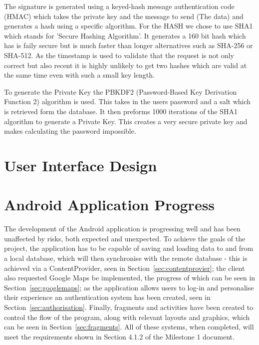 \documentclass[11pt,a4paper]{article}
\begin{document}
The signature is generated using a keyed-hash message authentication code (HMAC) which takes the private key and the message to send (The data) and generates a hash using a specific algorithm. For the HASH we chose to use SHA1 which stands for 'Secure Hashing Algorithm'. It generates a 160 bit hash which has is faily secure but is much faster than longer alternatives such as SHA-256 or SHA-512. As the timestamp is used to validate that the request is not only correct but also recent it is highly unlikely to get two hashes which are valid at the same time even with such a small key length. 

To generate the Private Key the PBKDF2 (Password-Based Key Derivation Function 2) algorithm is used. This takes in the users password and a salt which is retrieved form the database. It then preforms 1000 iterations of the SHA1 algorithm to generate a Private Key. This creates a very secure private key and makes calculating the password impossible. 




\section{User Interface Design}

\section{Android Application Progress}
The development of the Android application is progressing well and has been unaffected by risks, both expected and unexpected. To achieve the goals of the project, the application has to be capable of saving and loading data to and from a local database, which will then synchronise with the remote database - this is achieved via a ContentProvider, seen in Section~\ref{sec:contentprovier}; the client also requested Google Maps be implemented, the progress of which can be seen in Section~\ref{sec:googlemaps}; as the application allows users to log-in and personalise their experience an authentication system has been created, seen in Section~\ref{sec:authorisation}. Finally, fragments and activities have been created to control the flow of the program, along with relevant layouts and graphics, which can be seen in Section~\ref{sec:fragments}. All of these systems, when completed, will meet the requirements shown in Section 4.1.2 of the Milestone 1 document. %
\end{document}
